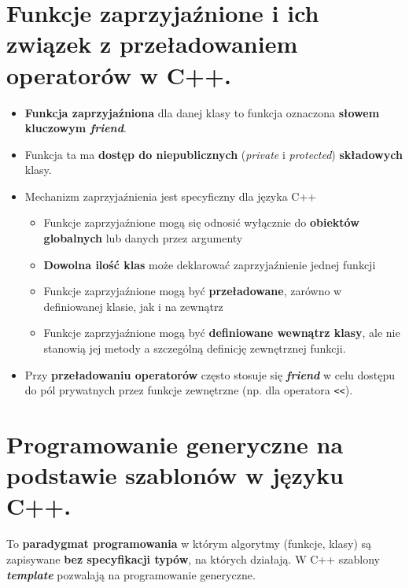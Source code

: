 \documentclass[main.tex]{subfiles}
\begin{document}
    \section{Funkcje zaprzyjaźnione i ich związek z przeładowaniem operatorów w C++.}
    \begin{itemize}
        \item \textbf{Funkcja zaprzyjaźniona} dla danej klasy to funkcja oznaczona \textbf{słowem kluczowym
        \textit{friend}}.
        \item Funkcja ta ma \textbf{dostęp do niepublicznych} (\textit{private} i
        \textit{protected}) \textbf{składowych} klasy.

        \item Mechanizm zaprzyjaźnienia jest specyficzny dla języka C++
        \begin{itemize}[noitemsep]
            \item Funkcje zaprzyjaźnione mogą się odnosić wyłącznie do \textbf{obiektów globalnych} lub danych przez
            argumenty
            \item \textbf{Dowolna ilość klas} może deklarować zaprzyjaźnienie jednej funkcji
            \item Funkcje zaprzyjaźnione mogą być \textbf{przeładowane}, zarówno w definiowanej klasie, jak i na zewnątrz
            \item Funkcje zaprzyjaźnione mogą być \textbf{definiowane wewnątrz klasy}, ale nie stanowią jej metody a
            szczególną definicję zewnętrznej funkcji.
        \end{itemize}

        \item Przy \textbf{przeładowaniu operatorów} często stosuje się \textbf{\textit{friend}}  w celu dostępu do pól
        prywatnych przez funkcje zewnętrzne (np. dla operatora \texttt{<<}).
    \end{itemize}


    \section{Programowanie generyczne na podstawie szablonów w języku C++.}

    To \textbf{paradygmat programowania} w którym algorytmy (funkcje, klasy) są zapisywane \textbf{bez specyfikacji typów},
    na których działają.
    W C++ szablony \textbf{\textit{template}} pozwalają na programowanie generyczne.\\
\end{document}

